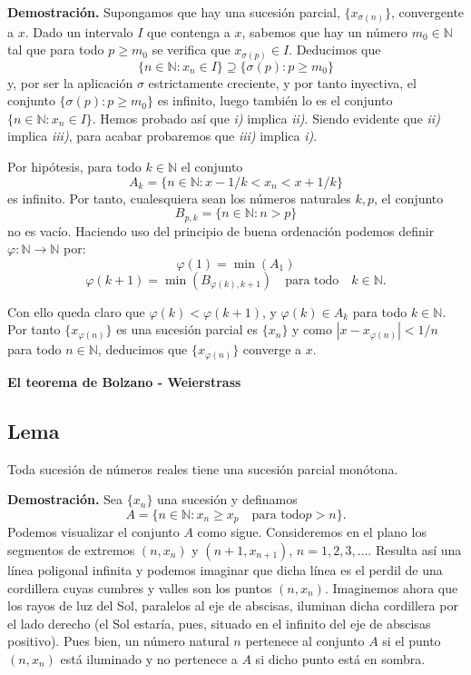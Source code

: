 \documentclass[10pt,a4paper]{article}
\begin{document}
	\textbf{Demostración. }Supongamos que hay una sucesión parcial, $\{x_{\sigma(n)}\}$, convergente a $x$. Dado un intervalo $I$ que contenga a $x$, sabemos que hay un número $m_0 \in \mathbb{N}$ tal que para todo $p \geq m_0$ se verifica que $x_{\sigma(p)} \in I$. Deducimos que 
	$$\{n \in \mathbb{N} : x_n \in I\} \supseteq \{\sigma(p): p \geq m_0\}$$
	y, por ser la aplicación $\sigma$ estrictamente creciente, y por tanto inyectiva, el conjunto $\{\sigma(p): p \geq m_0\}$ es infinito, luego también lo es el conjunto $\{n \in \mathbb{N} : x_n \in I\}$. Hemos probado así que \textit{i)} implica \textit{ii)}. Siendo evidente que \textit{ii)} implica \textit{iii)}, para acabar probaremos que \textit{iii)} implica \textit{i)}.
	
	Por hipótesis, para todo $k \in \mathbb{N}$ el conjunto 
	$$A_k = \{n \in \mathbb{N}: x- 1/k < x_n < x+1/k\}$$
	es infinito. Por tanto, cualesquiera sean los números naturales $k, p$, el conjunto 
	$$B_{p, k} = \{n \in \mathbb{N}: n > p\}$$
	no es vacío. Haciendo uso del principio de buena ordenación podemos definir $\varphi: \mathbb{N} \rightarrow \mathbb{N}$ por:
	$$ \varphi(1) = \min(A_1)$$
	$$\varphi(k+1) = \min(B_{\varphi(k), k+1}) \quad \text{para todo} \quad k \in \mathbb{N}.$$
	
	Con ello queda claro que $\varphi(k) < \varphi(k+1)$, y $\varphi(k) \in A_k$ para todo $k \in \mathbb{N}$. Por tanto $\{x_{\varphi(n)}\}$ es una sucesión parcial es $\{x_n\}$ y como $|x - x_{\varphi(n)}|< 1/n$ para todo $n \in \mathbb{N}$, deducimos que $\{x_{\varphi(n)}\}$ converge a $x$.
	
	\vspace{0.3 cm}
	
	\textbf{\Large{El teorema de Bolzano - Weierstrass}}
	
	\subsection{Lema}
	Toda sucesión de números reales tiene una sucesión parcial monótona.
	
	\textbf{Demostración. }Sea $\{x_n\}$ una sucesión y definamos 
	$$ A = \{n \in \mathbb{N}: x_n \geq x_p \quad \text{para todo} p > n\}.$$
	Podemos visualizar el conjunto $A$ como sigue. Consideremos en el plano los segmentos de extremos $(n, x_n)$ y $(n+1, x_{n+1})$, $n = 1, 2, 3, \dots$. Resulta así una línea poligonal infinita y podemos imaginar que dicha línea es el perdil de una cordillera cuyas cumbres y valles son los puntos $(n, x_n)$. Imaginemos ahora que los rayos de luz del Sol, paralelos al eje de abscisas, iluminan dicha cordillera por el lado derecho (el Sol estaría, pues, situado en el infinito del eje de abscisas positivo). Pues bien, un número natural $n$ pertenece al conjunto $A$ si el punto $(n, x_n)$ está iluminado y no pertenece a $A$ si dicho punto está en sombra.
	
\end{document}

